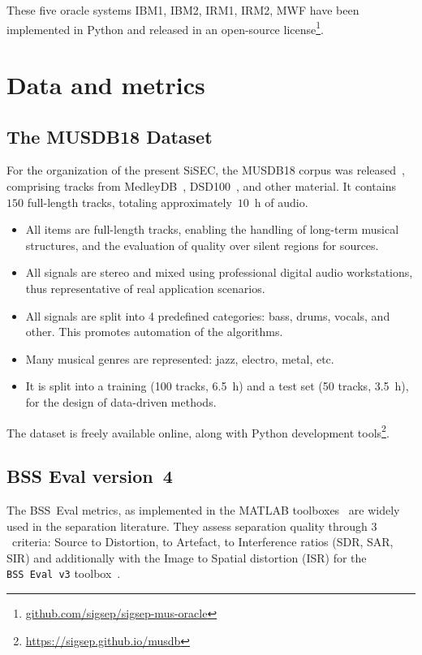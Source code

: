 \documentclass{llncs}
\begin{document}
These five oracle systems IBM1, IBM2, IRM1, IRM2, MWF have been implemented in Python and released in an open-source license\footnote{\url{github.com/sigsep/sigsep-mus-oracle}}.

\section{Data and metrics}

\subsection{The MUSDB18 Dataset}
For the organization of the present SiSEC, the MUSDB18 corpus was released~\cite{musdb18}, comprising tracks from MedleyDB~\cite{medleydb}, DSD100~\cite{sisec2015,sisec2016}, and other material. It contains $150$ full-length tracks, totaling approximately~$10$~h of audio.
\begin{itemize}
\item All items are full-length tracks, enabling the handling of long-term musical structures, and the evaluation of quality over silent regions for sources.
\item All signals are stereo and mixed using professional digital audio workstations, thus representative of real application scenarios.
\item All signals are split into 4 predefined categories: bass, drums, vocals, and other. This promotes automation of the algorithms.
\item Many musical genres are represented: jazz, electro, metal, etc.
\item It is split into a training (100 tracks, 6.5~h) and a test set (50 tracks, 3.5~h), for the design of data-driven methods.
\end{itemize}
The dataset is freely available online, along with Python development tools\footnote{\url{https://sigsep.github.io/musdb}}.

\subsection{BSS Eval version~4}
\label{ssec:bsseval-results}

The BSS~Eval metrics, as implemented in the MATLAB toolboxes~\cite{bssevalv2,bssevalv3} are widely used in the separation literature. They assess separation quality  through $3$~criteria: Source to Distortion, to Artefact, to Interference ratios (SDR, SAR, SIR) and additionally with the Image to Spatial distortion (ISR) for the \texttt{BSS~Eval v3} toolbox~\cite{bssevalv3}.
\end{document}
